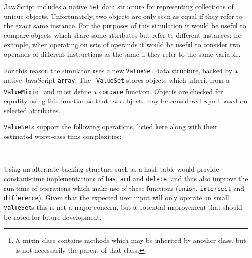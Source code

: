 \documentclass[bsc,twoside,singlespacing,parskip,logo,notimes,normalheadings]{infthesis}
\begin{document}
    JavaScript includes a native {\tt Set} data structure for
    representing collections of unique objects. Unfortunately, two
    objects are only seen as equal if they refer to the exact same
    instance. For the purposes of this simulation it would be useful
    to compare objects which share some attributes but refer to
    different instances; for example, when operating on sets of
    operands it would be useful to consider two operands of different
    instructions as the same if they refer to the same variable.

    For this reason the simulator uses a new {\tt ValueSet} data
    structure, backed by a native JavaScript {\tt array}. The {\tt
      ValueSet} stores objects which inherit from a {\tt
      ValueMixin}\footnote{A mixin class contains methods which may be
      inherited by another class, but is not necessarily the parent of
      that class.} and must define a {\tt compare} function. Objects
    are checked for equality using this function so that two objects
    may be considered equal based on selected attributes.

    {\tt ValueSet}s support the following operations, listed here
    along with their estimated worst-case time complexities:

    \begin{table}[!ht]
      \centering
      \def\arraystretch{1.2}
      \\[2mm]
    \end{table}

    Using an alternate backing structure such as a hash table would
    provide constant-time implementations of {\tt has}, {\tt add} and
    {\tt delete}, and thus also improve the run-time of operations
    which make use of these functions ({\tt union}, {\tt intersect}
    and {\tt difference}). Given that the expected user input will
    only operate on small {\tt ValueSet}s this is not a major concern,
    but a potential improvement that should be noted for future
    development.
    
\end{document}
